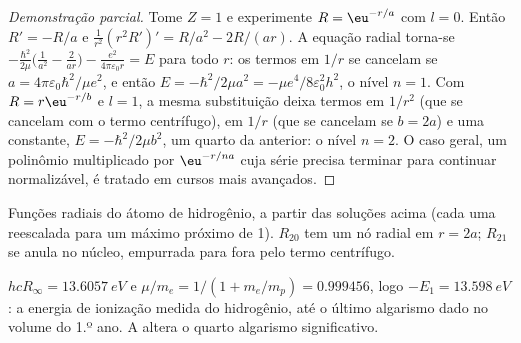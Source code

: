 \begin{proof}[Demonstração parcial]
Tome $Z = 1$ e experimente $R = \eu^{-r/a}$ com $l = 0$. Então $R' = -R/a$ e
$\frac{1}{r^2}(r^2R')' = R/a^2 - 2R/(ar)$. A equação radial torna-se
$-\frac{\hbar^2}{2\mu}\big(\frac{1}{a^2} - \frac{2}{ar}\big) - \frac{e^2}{4\pi
\varepsilon_0r} = E$ para todo $r$: os termos em $1/r$ se cancelam se $a =
4\pi\varepsilon_0\hbar^2/\mu e^2$, e então $E = -\hbar^2/2\mu a^2 = -\mu
e^4/8\varepsilon_0^2h^2$, o nível $n = 1$. Com $R = r\eu^{-r/b}$ e $l = 1$,
a mesma substituição deixa termos em $1/r^2$ (que se cancelam com o termo
centrífugo), em $1/r$ (que se cancelam se $b = 2a$) e uma constante, $E =
-\hbar^2/2\mu b^2$, um quarto da anterior: o nível $n = 2$. O caso geral,
um polinômio multiplicado por $\eu^{-r/na}$ cuja série precisa terminar para
continuar normalizável, é tratado em cursos mais avançados.
\end{proof}

\begin{omfigure}

{\small Funções radiais do átomo de hidrogênio, a partir das soluções acima
(cada uma reescalada para um máximo próximo de 1). $R_{20}$ tem um nó radial
em $r = 2a$; $R_{21}$ se anula no núcleo, empurrada para fora pelo termo centrífugo.}
\end{omfigure}

\begin{example}\label{ex:b3:quantum-model-systems:ie}
$hcR_\infty = \qty{13.6057}{eV}$ e $\mu/m_e = 1/(1 + m_e/m_p) = 0.999456$, logo
$-E_1 = \qty{13.598}{eV}$: a energia de ionização medida do hidrogênio, até o
último algarismo dado no volume do 1.º ano. A  altera o quarto
algarismo significativo.
\end{example}

